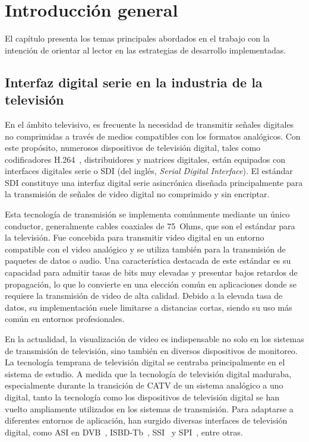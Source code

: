 \chapter{Introducción general}\label{Chapter1}

El capítulo presenta los temas principales abordados en el trabajo con la
intención de orientar al lector en las estrategias de desarrollo
implementadas.

\section{Interfaz digital serie en la industria de la televisión}

  En el ámbito televisivo, es frecuente la necesidad de transmitir señales
  digitales no comprimidas a través de medios compatibles con los formatos
  analógicos. Con este propósito, numerosos dispositivos de televisión digital,
  tales como codificadores H.264~\citep{h264}, distribuidores y matrices digitales, están
  equipados con interfaces digitales serie o SDI (del inglés,
  \textit{Serial Digital Interface}). El estándar SDI constituye una interfaz
  digital serie asincrónica diseñada principalmente para la transmisión de señales
  de video digital no comprimido y sin encriptar.

  Esta tecnología de transmisión se implementa comúnmente mediante un único
  conductor, generalmente cables coaxiales de 75~Ohms, que son el estándar para
  la televisión. Fue concebida para transmitir video digital en un entorno
  compatible con el video analógico y se utiliza también para la transmisión de
  paquetes de datos o audio. Una característica destacada de este estándar es su
  capacidad para admitir tasas de bits muy elevadas y presentar bajos retardos de
  propagación, lo que lo convierte en una elección común en aplicaciones donde se
  requiere la transmisión de video de alta calidad. Debido a la elevada tasa de
  datos, su implementación suele limitarse a distancias cortas, siendo su uso más
  común en entornos profesionales.

  En la actualidad, la visualización de video es indispensable no solo en los
  sistemas de transmisión de televisión, sino también en diversos dispositivos de
  monitoreo. La tecnología temprana de televisión digital se centraba
  principalmente en el sistema de estudio. A medida que la tecnología de
  televisión digital maduraba, especialmente durante la transición de CATV de un
  sistema analógico a uno digital, tanto la tecnología como los dispositivos de
  televisión digital se han vuelto ampliamente utilizados en los sistemas de
  transmisión. Para adaptarse a diferentes entornos de aplicación, han surgido
  diversas interfaces de televisión digital, como ASI en DVB~\citep{asi-dvb},
  ISBD-Tb~\citep{isbdt}, SSI~\citep{ssi} y SPI~\citep{spi},
  entre otras.

